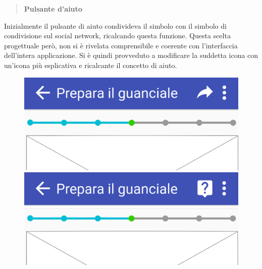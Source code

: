 \begin{quote}
	\textbf{Pulsante d'aiuto}
\end{quote}
Inizialmente il pulsante di aiuto condivideva il simbolo con il simbolo di
condivisione sul social network, ricalcando questa funzione.  Questa scelta
progettuale però, non si è rivelata comprensibile e coerente con l'interfaccia
dell'intera applicazione.  Si è quindi provveduto a modificare la suddetta icona
con un'icona più esplicativa e ricalcante il concetto di aiuto.
\begin{figure}[H]
	\begin{minipage}{.49\textwidth}
		\includegraphics[width=\textwidth]{img/modifiche/condividi_passo_old.png}
	\end{minipage}
	\begin{minipage}{.49\textwidth}
		\includegraphics[width=\textwidth]{img/modifiche/condividi_passo_new.png}
	\end{minipage}
\end{figure}

